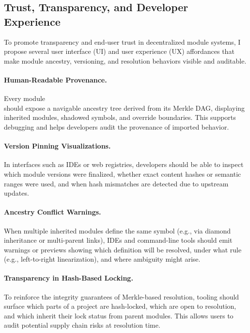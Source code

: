 \documentclass[sigplan,screen]{acmart}
\begin{document}
\subsection{Trust, Transparency, and Developer Experience}
\label{sec:trust-ux}

To promote transparency and end-user trust in decentralized module systems, I propose several user interface (UI) and user experience (UX) affordances that make module ancestry, versioning, and resolution behaviors visible and auditable.

\paragraph{Human-Readable Provenance.}
Every module \\should expose a navigable ancestry tree derived from its Merkle DAG, displaying inherited modules, shadowed symbols, and override boundaries. This supports debugging and helps developers audit the provenance of imported behavior.

\paragraph{Version Pinning Visualizations.}
In interfaces such as IDEs or web registries, developers should be able to inspect which module versions were finalized, whether exact content hashes or semantic ranges were used, and when hash mismatches are detected due to upstream updates.

\paragraph{Ancestry Conflict Warnings.}
When multiple inherited modules define the same symbol (e.g., via diamond inheritance or multi-parent links), IDEs and command-line tools should emit warnings or previews showing which definition will be resolved, under what rule (e.g., left-to-right linearization), and where ambiguity might arise.

\paragraph{Transparency in Hash-Based Locking.}
To reinforce the integrity guarantees of Merkle-based resolution, tooling should surface which parts of a project are hash-locked, which are open to resolution, and which inherit their lock status from parent modules. This allows users to audit potential supply chain risks at resolution time.
\end{document}
